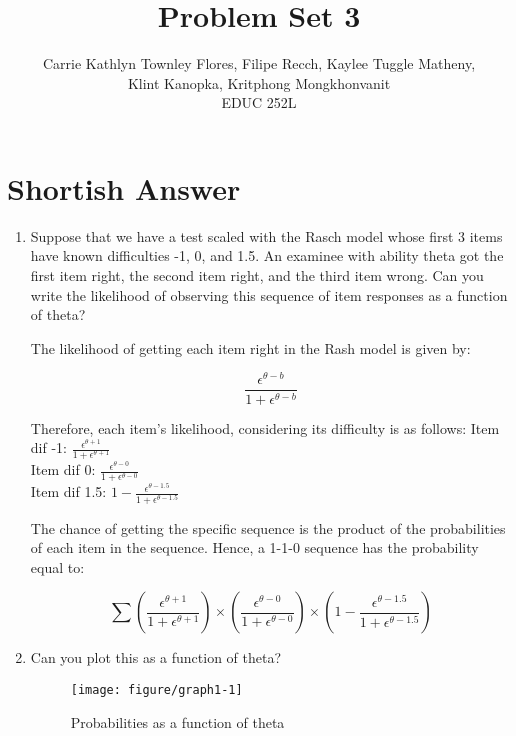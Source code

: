 \documentclass{article}\usepackage[]{graphicx}\usepackage[]{color}
\title{Problem Set 3}
\author{Carrie Kathlyn Townley Flores, Filipe Recch, Kaylee Tuggle Matheny, \\ Klint Kanopka, Kritphong Mongkhonvanit \\ EDUC 252L}
\makeatletter
\def\maxwidth{ %
  \ifdim\Gin@nat@width>\linewidth
    \linewidth
  \else
    \Gin@nat@width
  \fi
}
\newenvironment{knitrout}{}{} %
\makeatother
\begin{document}
\maketitle

\section*{Shortish Answer}
\begin{enumerate}

\item Suppose that we have a test scaled with the Rasch model whose first 3 items have known difficulties -1, 0, and 1.5. An examinee with ability theta got the first item right, the second item right, and the third item wrong. Can you write the likelihood of observing this sequence of item responses as a function of theta?

The likelihood of getting each item right in the Rash model is given by:

$$ \frac{\epsilon^{\theta - b}}{1+\epsilon^{\theta - b}} $$ 

Therefore, each item's likelihood, considering its difficulty is as follows:
Item dif -1: $ \frac{\epsilon^{\theta + 1}}{1+\epsilon^{\theta + 1}} $ \\
Item dif 0: $ \frac{\epsilon^{\theta - 0}}{1+\epsilon^{\theta - 0}} $ \\
Item dif 1.5: $ 1 - \frac{\epsilon^{\theta - 1.5}}{1+\epsilon^{\theta - 1.5}} $ 

The chance of getting the specific sequence is the product of the probabilities of each item in the sequence. Hence, a 1-1-0 sequence has the probability equal to:

$$ \sum \left(\frac{\epsilon^{\theta + 1}}{1+\epsilon^{\theta + 1}}\right) \times \left(\frac{\epsilon^{\theta - 0}}{1+\epsilon^{\theta - 0}} \right) \times \left(1 - \frac{\epsilon^{\theta - 1.5}}{1+\epsilon^{\theta - 1.5}} \right) $$

\item Can you plot this as a function of theta?

\begin{knitrout}
\color{fgcolor}\begin{figure}[H]

{\centering \texttt{[image: figure/graph1-1]} 

}

\caption[Probabilities as a function of theta]{Probabilities as a function of theta}\label{fig:graph1}
\end{figure}



\end{knitrout}
\end{enumerate}
\end{document}
